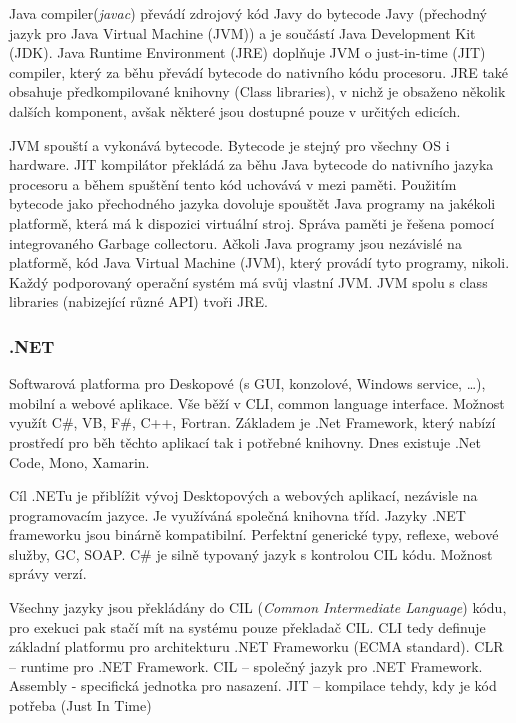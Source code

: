 Java compiler(\textit{javac}) převádí zdrojový kód Javy do bytecode Javy (přechodný jazyk pro Java Virtual Machine (JVM)) a je součástí Java Development Kit (JDK). Java Runtime Environment (JRE) doplňuje JVM o just-in-time (JIT) compiler, který za běhu převádí bytecode do nativního kódu procesoru. JRE také obsahuje předkompilované knihovny (Class libraries), v nichž je obsaženo několik dalších komponent, avšak některé jsou dostupné pouze v určitých edicích.


JVM spouští a vykonává bytecode. Bytecode je stejný pro všechny OS i hardware. JIT kompilátor překládá za běhu Java bytecode do nativního jazyka procesoru a během spuštění tento kód uchovává v mezi paměti. Použitím bytecode jako přechodného jazyka dovoluje spouštět Java programy na jakékoli platformě, která má k dispozici virtuální stroj. Správa paměti je řešena pomocí integrovaného Garbage collectoru. Ačkoli Java programy jsou nezávislé na platformě, kód Java Virtual Machine (JVM), který provádí tyto programy, nikoli. Každý podporovaný operační systém má svůj vlastní JVM. JVM spolu s class libraries (nabizející různé API) tvoři JRE.

\subsubsection{.NET}
Softwarová platforma pro Deskopové (s GUI, konzolové, Windows service, \ldots), mobilní a webové aplikace. Vše běží v CLI, common language interface.
Možnost využít C\#, VB, F\#, C++, Fortran. Základem je .Net Framework, který nabízí prostředí pro běh těchto aplikací tak i potřebné knihovny. Dnes existuje .Net Code, Mono, Xamarin.

Cíl .NETu je přiblížit vývoj Desktopových a webových aplikací, nezávisle na programovacím jazyce. Je využíváná společná knihovna tříd. Jazyky .NET frameworku jsou binárně kompatibilní. Perfektní generické typy, reflexe, webové služby, GC, SOAP. C\# je silně typovaný jazyk s kontrolou CIL kódu. Možnost správy verzí.

Všechny jazyky jsou překládány do CIL (\textit{Common Intermediate Language}) kódu, pro exekuci pak stačí mít na systému pouze překladač CIL. CLI tedy definuje základní platformu pro architekturu .NET Frameworku (ECMA standard). CLR – runtime pro .NET Framework. CIL – společný jazyk pro .NET Framework.
Assembly  - specifická jednotka pro nasazení. JIT – kompilace tehdy, kdy je kód potřeba (Just In Time)


